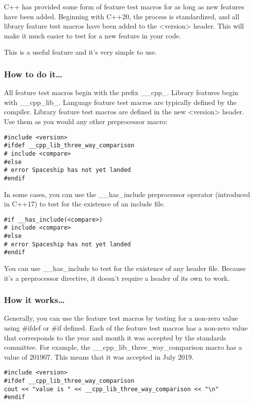 
C++ has provided some form of feature test macros for as long as new features have been added. Beginning with C++20, the process is standardized, and all library feature test macros have been added to the <version> header. This will make it much easier to test for a new feature in your code.

This is a useful feature and it's very simple to use.

\subsubsection{How to do it…}

All feature test macros begin with the prefix \_\_cpp\_. Library features begin with \_\_cpp\_lib\_. Language feature test macros are typically defined by the compiler. Library feature test macros are defined in the new <version> header. Use them as you would any other preprocessor macro:

\begin{lstlisting}[style=styleCXX]
#include <version>
#ifdef __cpp_lib_three_way_comparison
# include <compare>
#else
# error Spaceship has not yet landed
#endif
\end{lstlisting}

In some cases, you can use the \_\_has\_include preprocessor operator (introduced in C++17) to test for the existence of an include file.

\begin{lstlisting}[style=styleCXX]
#if __has_include(<compare>)
# include <compare>
#else
# error Spaceship has not yet landed
#endif
\end{lstlisting}

You can use \_\_has\_include to test for the existence of any header file. Because it's a preprocessor directive, it doesn't require a header of its own to work.

\subsubsection{How it works…}

Generally, you can use the feature test macros by testing for a non-zero value using \#ifdef or \#if defined. Each of the feature test macros has a non-zero value that corresponds to the year and month it was accepted by the standards committee. For example, the \_\_cpp\_lib\_three\_way\_comparison macro has a value of 201907. This means that it was accepted in July 2019.

\begin{lstlisting}[style=styleCXX]
#include <version>
#ifdef __cpp_lib_three_way_comparison
cout << "value is " << __cpp_lib_three_way_comparison << "\n"
#endif
\end{lstlisting}

